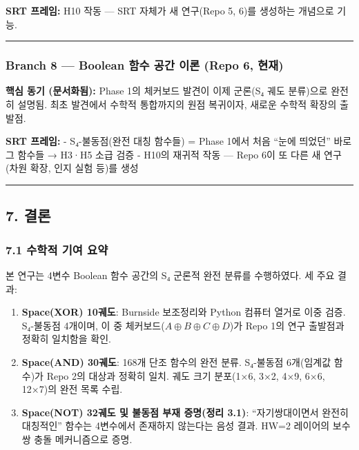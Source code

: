 \documentclass[
]{article}
\begin{document}
\textbf{SRT 프레임:} H10 작동 --- SRT 자체가 새 연구(Repo 5, 6)를
생성하는 개념으로 기능.

\begin{center}\rule{0.5\linewidth}{0.5pt}\end{center}

\subsubsection{Branch 8 --- Boolean 함수 공간 이론 (Repo 6,
현재)}\label{branch-8-boolean-uxd568uxc218-uxacf5uxac04-uxc774uxb860-repo-6-uxd604uxc7ac}

\textbf{핵심 동기 (문서화됨):} Phase 1의 체커보드 발견이 이제 군론(S₄
궤도 분류)으로 완전히 설명됨. 최초 발견에서 수학적 통합까지의 원점
복귀이자, 새로운 수학적 확장의 출발점.

\textbf{SRT 프레임:} - S₄-불동점(완전 대칭 함수들) = Phase 1에서 처음
``눈에 띄었던'' 바로 그 함수들 → H3·H5 소급 검증 - H10의 재귀적 작동 ---
Repo 6이 또 다른 새 연구(차원 확장, 인지 실험 등)를 생성

\begin{center}\rule{0.5\linewidth}{0.5pt}\end{center}

\subsection{7. 결론}\label{uxacb0uxb860}

\subsubsection{7.1 수학적 기여
요약}\label{uxc218uxd559uxc801-uxae30uxc5ec-uxc694uxc57d}

본 연구는 4변수 Boolean 함수 공간의 S₄ 군론적 완전 분류를 수행하였다. 세
주요 결과:

\begin{enumerate}
\def\labelenumi{\arabic{enumi}.}
\item
  \textbf{Space(XOR) 10궤도}: Burnside 보조정리와 Python 컴퓨터 열거로
  이중 검증. S₄-불동점 4개이며, 이 중
  체커보드(\(A \oplus B \oplus C \oplus D\))가 Repo 1의 연구 출발점과
  정확히 일치함을 확인.
\item
  \textbf{Space(AND) 30궤도}: 168개 단조 함수의 완전 분류. S₄-불동점
  6개(임계값 함수)가 Repo 2의 대상과 정확히 일치. 궤도 크기 분포(1×6,
  3×2, 4×9, 6×6, 12×7)의 완전 목록 수립.
\item
  \textbf{Space(NOT) 32궤도 및 불동점 부재 증명(정리 3.1)}:
  ``자기쌍대이면서 완전히 대칭적인'' 함수는 4변수에서 존재하지 않는다는
  음성 결과. HW=2 레이어의 보수 쌍 충돌 메커니즘으로 증명.
\end{enumerate}
\end{document}
